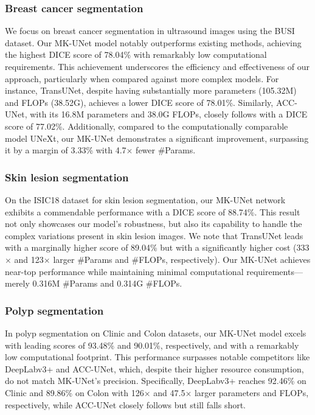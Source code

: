 \subsubsection{Breast cancer segmentation}
We focus on breast cancer segmentation in ultrasound images using the BUSI dataset. Our MK-UNet model notably outperforms existing methods, achieving the highest DICE score of 78.04\% with remarkably low computational requirements. This achievement underscores the efficiency and effectiveness of our approach, particularly when compared against more complex models. For instance, TransUNet, despite having substantially more parameters (105.32M) and FLOPs (38.52G), achieves a lower DICE score of 78.01\%. Similarly, ACC-UNet, with its 16.8M parameters and 38.0G FLOPs, closely follows with a DICE score of 77.02\%. Additionally, compared to the computationally comparable model UNeXt, our MK-UNet demonstrates a significant improvement, surpassing it by a margin of 3.33\% with 4.7$\times$ fewer \#Params. %


\subsubsection{Skin lesion segmentation}
On the ISIC18 dataset for skin lesion segmentation, our MK-UNet network exhibits a commendable performance with a DICE score of 88.74\%. This result not only showcases our model's robustness, but also its capability to handle the complex variations present in skin lesion images. We note that TransUNet leads with a marginally higher score of 89.04\% but with a significantly higher cost (333$\times$ and 123$\times$ larger \#Params and \#FLOPs, respectively). Our MK-UNet achieves near-top performance while maintaining minimal computational requirements—merely 0.316M \#Params and 0.314G \#FLOPs. %

\subsubsection{Polyp segmentation}
\label{sssec:polyp_results}
In polyp segmentation on Clinic and Colon datasets, our MK-UNet model excels with leading scores of 93.48\% and 90.01\%, respectively, and with a remarkably low computational footprint. This performance surpasses notable competitors like DeepLabv3+ and ACC-UNet, which, despite their higher resource consumption, do not match MK-UNet's precision. Specifically, DeepLabv3+ reaches 92.46\% on Clinic and 89.86\% on Colon with 126$\times$ and 47.5$\times$ larger parameters and FLOPs, respectively, while ACC-UNet closely follows but still falls short. %


